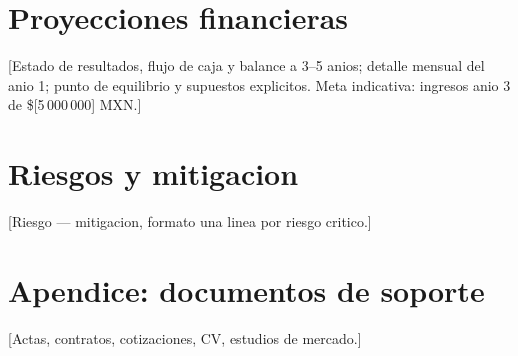 \documentclass[12pt]{article}
\newcommand{\Moneda}{MXN}
\newcommand{\IngresoAnioTres}{[5\,000\,000]}
\begin{document}
\section{Proyecciones financieras}
[Estado de resultados, flujo de caja y balance a 3–5 anios; detalle mensual
del anio 1; punto de equilibrio y supuestos explicitos. Meta indicativa:
ingresos anio 3 de \$\IngresoAnioTres{} \Moneda{}.]

\section{Riesgos y mitigacion}
[Riesgo — mitigacion, formato una linea por riesgo critico.]

\appendix
\section{Apendice: documentos de soporte}
[Actas, contratos, cotizaciones, CV, estudios de mercado.]
\end{document}
